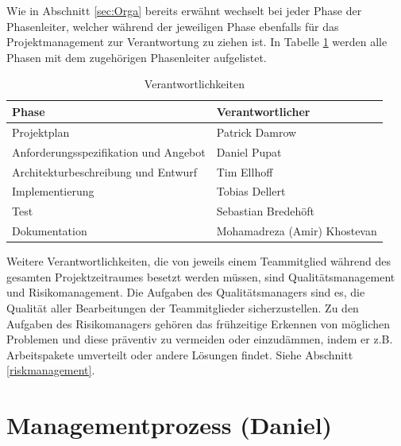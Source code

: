 \documentclass[fontsize=12pt,paper=a4,twoside]{scrartcl}
\begin{document}
Wie in Abschnitt \ref{sec:Orga} bereits erwähnt wechselt bei jeder Phase der Phasenleiter, welcher während der jeweiligen Phase ebenfalls für das Projektmanagement zur Verantwortung zu ziehen ist. In Tabelle \ref{tab:respons} werden alle Phasen mit dem zugehörigen Phasenleiter aufgelistet.

\begin{table}[htbp]
\caption{Verantwortlichkeiten}
\label{tab:respons}
\centering
\begin{tabular}{p{}|p{}}
\hline Phase & Verantwortlicher \\ \hline
\hline Projektplan & Patrick Damrow\\
\hline Anforderungsspezifikation und Angebot & Daniel Pupat\\
\hline Architekturbeschreibung und Entwurf & Tim Ellhoff\\
\hline Implementierung & Tobias Dellert\\
\hline Test & Sebastian Bredehöft\\
\hline Dokumentation & Mohamadreza (Amir) Khostevan\\
\hline 
\end{tabular}
\end{table}

Weitere Verantwortlichkeiten, die von jeweils einem Teammitglied während des gesamten Projektzeitraumes besetzt werden müssen, sind Qualitätsmanagement und Risikomanagement.
Die Aufgaben des Qualitätsmanagers sind es, die Qualität aller Bearbeitungen der Teammitglieder sicherzustellen.
Zu den Aufgaben des Risikomanagers gehören das frühzeitige Erkennen von möglichen Problemen und diese präventiv zu vermeiden oder einzudämmen, indem er z.B. Arbeitspakete umverteilt oder andere Lösungen findet. Siehe Abschnitt \ref{riskmanagement}.


\section{Managementprozess (Daniel)}
\end{document}
